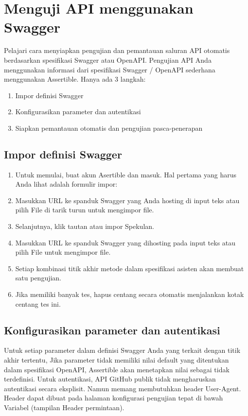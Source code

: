 \section{Menguji API menggunakan Swagger}
Pelajari cara menyiapkan pengujian dan pemantauan saluran API otomatis berdasarkan spesifikasi Swagger atau OpenAPI.
Pengujian API Anda menggunakan informasi dari spesifikasi Swagger / OpenAPI sederhana menggunakan Assertible. Hanya ada 3 langkah:
\begin{enumerate}
\item Impor definisi Swagger
\item Konfigurasikan parameter dan autentikasi
\item Siapkan pemantauan otomatis dan pengujian pasca-penerapan
\end{enumerate}

\subsection{Impor definisi Swagger}
\begin{enumerate}
\item Untuk memulai, buat akun Asertible dan masuk. Hal pertama yang harus Anda lihat adalah formulir impor:
\item Masukkan URL ke spanduk Swagger yang Anda hosting di input teks atau pilih File di tarik turun untuk mengimpor file.
\item Selanjutnya, klik tautan atau impor Spekulan.
\item Masukkan URL ke spanduk Swagger yang dihosting pada input teks atau pilih File untuk mengimpor file.
\item Setiap kombinasi titik akhir metode dalam spesifikasi asisten akan membuat satu pengujian.
\item Jika  memiliki banyak tes, hapus centang secara otomatis menjalankan kotak centang tes ini.
\end{enumerate}

\subsection{Konfigurasikan parameter dan autentikasi}
Untuk setiap parameter dalam definisi Swagger Anda yang terkait dengan titik akhir tertentu, Jika parameter tidak memiliki nilai default yang ditentukan dalam spesifikasi OpenAPI, Assertible akan menetapkan nilai sebagai tidak terdefinisi.
Untuk autentikasi, API GitHub publik tidak mengharuskan autentikasi secara eksplisit. Namun memang membutuhkan header User-Agent. Header dapat dibuat pada halaman konfigurasi pengujian tepat di bawah Variabel (tampilan Header permintaan).

